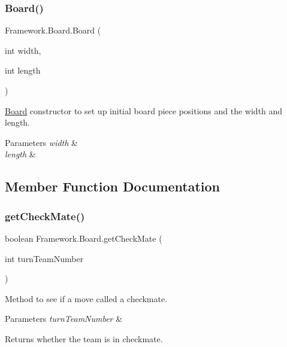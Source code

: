 \subsubsection{\texorpdfstring{Board()}{Board()}}
{\footnotesize\ttfamily Framework.\+Board.\+Board (\begin{DoxyParamCaption}\item[{int}]{width,  }\item[{int}]{length }\end{DoxyParamCaption})}

\hyperlink{class_framework_1_1_board}{Board} constructor to set up initial board piece positions and the width and length. 
\begin{DoxyParams}{Parameters}
{\em width} & \\
\hline
{\em length} & \\
\hline
\end{DoxyParams}


\subsection{Member Function Documentation}
\hypertarget{class_framework_1_1_board_a73c5e51640524eeb2f34ca829e94dd02}{}\label{class_framework_1_1_board_a73c5e51640524eeb2f34ca829e94dd02} 
\subsubsection{\texorpdfstring{get\+Check\+Mate()}{getCheckMate()}}
{\footnotesize\ttfamily boolean Framework.\+Board.\+get\+Check\+Mate (\begin{DoxyParamCaption}\item[{int}]{turn\+Team\+Number }\end{DoxyParamCaption})}

Method to see if a move called a checkmate. 
\begin{DoxyParams}{Parameters}
{\em turn\+Team\+Number} & \\
\hline
\end{DoxyParams}
\begin{DoxyReturn}{Returns}
whether the team is in checkmate. 
\end{DoxyReturn}
\hypertarget{class_framework_1_1_board_a3b496b97b747b51a2777ee6b4034a5bd}{}\label{class_framework_1_1_board_a3b496b97b747b51a2777ee6b4034a5bd} 
